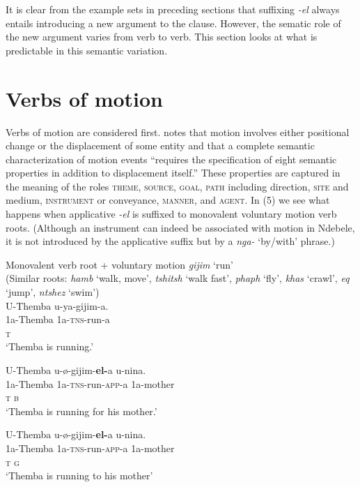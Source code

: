 \documentclass[output=paper]{langsci/langscibook}
\begin{document}
It is clear from the example sets in preceding sections that suffixing \textit{-el} always entails introducing a new argument to the clause. However, the sematic role of the new argument varies from verb to verb. This section looks at what is predictable in this semantic variation.

\section{Verbs of motion }

Verbs of motion are considered first. \citet[171]{Frawley1992} notes that motion involves either positional change or the displacement of some entity and that a complete semantic characterization of motion events “requires the specification of eight semantic properties in addition to displacement itself.” These properties are captured in the meaning of the roles \textsc{theme}, \textsc{source}, \textsc{goal}, \textsc{path} including direction, \textsc{site} and medium, \textsc{instrument} or conveyance, \textsc{manner}, and \textsc{agent}. In (5) we see what happens when applicative \textit{-el} is suffixed to monovalent voluntary motion verb roots. (Although an instrument can indeed be associated with motion in Ndebele, it is not introduced by the applicative suffix but by a \textit{nga-} ‘by/with’ phrase.)

\ea
{Monovalent verb root + voluntary motion \textit{gijim }‘run’}\\
 (Similar roots: \textit{hamb} ‘walk, move’, \textit{tshitsh} ‘walk fast’, \textit{phaph} ‘fly’, \textit{khas} ‘crawl’, \textit{eq} ‘jump’, \textit{ntshez} ‘swim’)\\
\ea
\gll U-Themba u-ya-gijim-a.\\
 1a-Themba 1a-\textsc{tns}-run-a \\
 \textsc{t}\\
\glt ‘Themba is running.’

\ex
\gll U-Themba u-ø-gijim-\textbf{el-}a u-nina. \\
 1a-Themba 1a-\textsc{tns}-run-\textsc{app}-a 1a-mother\\
 \textsc{t b}\\
\glt ‘Themba is running for his mother.’ 

\ex
\gll U-Themba u-ø-gijim-\textbf{el-}a u-nina. \\
 1a-Themba 1a-\textsc{tns}-run-\textsc{app}-a 1a-mother\\
 \textsc{t g}\\
\glt ‘Themba is running to his mother’
\end{document}
